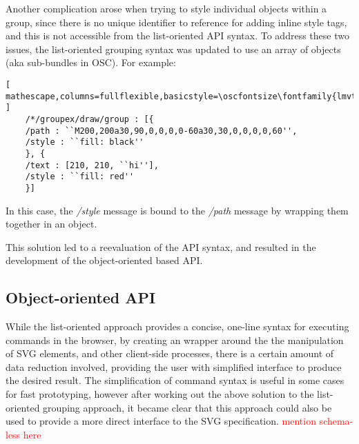 Another complication arose when trying to style individual objects within a group, since there is no unique identifier to reference for adding inline style tags, and this is not accessible from the list-oriented API syntax. To address these two issues, the list-oriented grouping syntax was updated to use an array of objects (aka sub-bundles in OSC). For example:
 
\begin{lstlisting}[ mathescape,columns=fullflexible,basicstyle=\oscfontsize\fontfamily{lmvtt}\selectfont ]
    /*/groupex/draw/group : [{
	/path : ``M200,200a30,90,0,0,0,0-60a30,30,0,0,0,0,60'',
	/style : ``fill: black''
    }, {
	/text : [210, 210, ``hi''],
	/style : ``fill: red''
    }]
\end{lstlisting}

\noindent
In this case, the \textit{/style} message is bound to the \textit{/path} message by wrapping them together in an object. 

This solution led to a reevaluation of the \drawsocket API syntax, and resulted in the development of the object-oriented based API.

\subsection{Object-oriented API}\label{sec:objstyle}
While the list-oriented approach provides a concise, one-line syntax for executing \drawsocket commands in the browser, by creating an wrapper around the the manipulation of SVG elements, and other client-side processes, there is a certain amount of data reduction involved, providing the user with simplified interface to produce the desired result. 
The simplification of command syntax is useful in some cases for fast prototyping, however after working out the above solution to the list-oriented grouping approach, it became clear that this approach could also be used to provide a more direct interface to the SVG specification.  \textcolor{red}{mention schema-less here}

